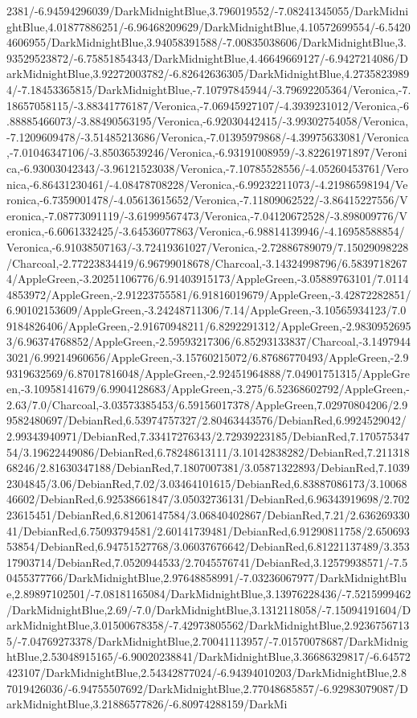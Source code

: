 {\begin{tikzternal}
2381/-6.94594296039/DarkMidnightBlue,3.796019552/-7.08241345055/DarkMidnightBlue,4.01877886251/-6.96468209629/DarkMidnightBlue,4.10572699554/-6.54204606955/DarkMidnightBlue,3.94058391588/-7.00835038606/DarkMidnightBlue,3.93529523872/-6.75851854343/DarkMidnightBlue,4.46649669127/-6.9427214086/DarkMidnightBlue,3.92272003782/-6.82642636305/DarkMidnightBlue,4.27358239894/-7.18453365815/DarkMidnightBlue,-7.10797845944/-3.79692205364/Veronica,-7.18657058115/-3.88341776187/Veronica,-7.06945927107/-4.3939231012/Veronica,-6.88885466073/-3.88490563195/Veronica,-6.92030442415/-3.99302754058/Veronica,-7.1209609478/-3.51485213686/Veronica,-7.01395979868/-4.39975633081/Veronica,-7.01046347106/-3.85036539246/Veronica,-6.93191008959/-3.82261971897/Veronica,-6.93003042343/-3.96121523038/Veronica,-7.10785528556/-4.05260453761/Veronica,-6.86431230461/-4.08478708228/Veronica,-6.99232211073/-4.21986598194/Veronica,-6.7359001478/-4.05613615652/Veronica,-7.11809062522/-3.86415227556/Veronica,-7.08773091119/-3.61999567473/Veronica,-7.04120672528/-3.898009776/Veronica,-6.6061332425/-3.64536077863/Veronica,-6.98814139946/-4.16958588854/Veronica,-6.91038507163/-3.72419361027/Veronica,-2.72886789079/7.15029098228/Charcoal,-2.77223834419/6.96799018678/Charcoal,-3.14324998796/6.58397182674/AppleGreen,-3.20251106776/6.91403915173/AppleGreen,-3.05889763101/7.01144853972/AppleGreen,-2.91223755581/6.91816019679/AppleGreen,-3.42872282851/6.90102153609/AppleGreen,-3.24248711306/7.14/AppleGreen,-3.10565934123/7.09184826406/AppleGreen,-2.91670948211/6.8292291312/AppleGreen,-2.98309526953/6.96374768852/AppleGreen,-2.59593217306/6.85293133837/Charcoal,-3.14979443021/6.99214960656/AppleGreen,-3.15760215072/6.87686770493/AppleGreen,-2.99319632569/6.87017816048/AppleGreen,-2.92451964888/7.04901751315/AppleGreen,-3.10958141679/6.9904128683/AppleGreen,-3.275/6.52368602792/AppleGreen,-2.63/7.0/Charcoal,-3.03573385453/6.59156017378/AppleGreen,7.02970804206/2.99582480697/DebianRed,6.53974757327/2.80463443576/DebianRed,6.9924529042/2.99343940971/DebianRed,7.33417276343/2.72939223185/DebianRed,7.17057534754/3.19622449086/DebianRed,6.78248613111/3.10142838282/DebianRed,7.21131868246/2.81630347188/DebianRed,7.1807007381/3.05871322893/DebianRed,7.10392304845/3.06/DebianRed,7.02/3.03464101615/DebianRed,6.83887086173/3.1006846602/DebianRed,6.92538661847/3.05032736131/DebianRed,6.96343919698/2.70223615451/DebianRed,6.81206147584/3.06840402867/DebianRed,7.21/2.63626933041/DebianRed,6.75093794581/2.60141739481/DebianRed,6.91290811758/2.65069353854/DebianRed,6.94751527768/3.06037676642/DebianRed,6.81221137489/3.35317903714/DebianRed,7.0520944533/2.7045576741/DebianRed,3.12579938571/-7.50455377766/DarkMidnightBlue,2.97648858991/-7.03236067977/DarkMidnightBlue,2.89897102501/-7.08181165084/DarkMidnightBlue,3.13976228436/-7.5215999462/DarkMidnightBlue,2.69/-7.0/DarkMidnightBlue,3.1312118058/-7.15094191604/DarkMidnightBlue,3.01500678358/-7.42973805562/DarkMidnightBlue,2.92367567135/-7.04769273378/DarkMidnightBlue,2.70041113957/-7.01570078687/DarkMidnightBlue,2.53048915165/-6.90020238841/DarkMidnightBlue,3.36686329817/-6.64572423107/DarkMidnightBlue,2.54342877024/-6.94394010203/DarkMidnightBlue,2.87019426036/-6.94755507692/DarkMidnightBlue,2.77048685857/-6.92983079087/DarkMidnightBlue,3.21886577826/-6.80974288159/DarkMi
\end{tikzternal}}
